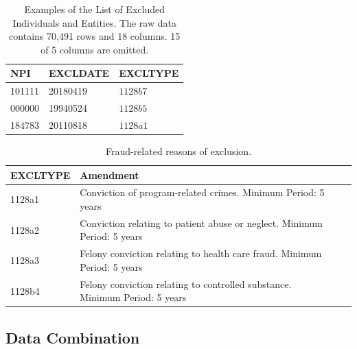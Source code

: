 \documentclass[dvipdfmx, english]{ampmt}             %
\begin{document}
\begin{table}[H]
\centering
\caption{Examples of the List of Excluded Individuals and Entities. The raw data contains 70,491 rows and 18 columns. 15 of 5 columns are omitted.}
\begin{tabular}{lll}
  \hline \hline
NPI & EXCLDATE & EXCLTYPE \\
  \hline
101111 & 20180419 & $1128b7$ \\
000000 & 19940524 & $1128b5$\\
 184783 & 20110818 & $1128a1$ \\
   \hline
\end{tabular}
\label{tb:leie}
\end{table}

\begin{table}[H]
\centering
\caption{Fraud-related reasons of exclusion.}
\begin{tabularx}{\linewidth}{lXlX}
  \hline \hline
EXCLTYPE & Amendment \\
  \hline
1128a1 & Conviction of program-related crimes. Minimum Period: 5 years& \\
1128a2 & Conviction relating to patient abuse or neglect. Minimum Period: 5 years& \\
 1128a3 & Felony conviction relating to health care fraud. Minimum Period: 5 years& \\
 1128b4 & Felony conviction relating to controlled substance. Minimum Period: 5 years& \\
   \hline
\end{tabularx}
\addtocounter{table}{-1}
\label{tb:exclusion}
\end{table}


\subsection{Data Combination}
\end{document}
